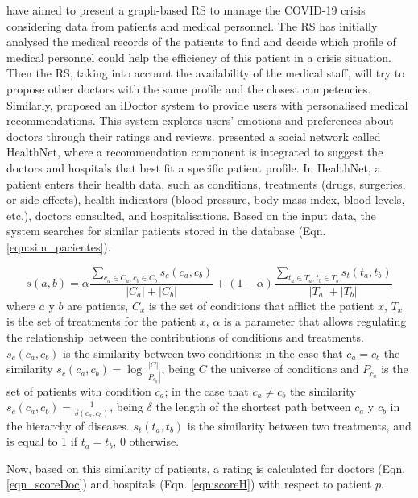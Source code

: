 \documentclass[sustainability,article,submit,pdftex,moreauthors]{Definitions/mdpi}
\begin{document}
\citet{sayeb2022graph} have aimed to present a graph-based RS to manage the COVID-19 crisis considering data from patients and medical personnel. The RS has initially analysed the medical records of the patients to find and decide which profile of medical personnel could help the efficiency of this patient in a crisis situation. Then the RS, taking into account the availability of the medical staff, will try to propose other doctors with the same profile and the closest competencies. Similarly, \citet{zhang2017idoctor} proposed an iDoctor system to provide users with personalised medical recommendations. This system explores users' emotions and preferences about doctors through their ratings and reviews. \citet{narducci2015recommender} presented a social network called HealthNet, where a recommendation component is integrated to suggest the doctors and hospitals that best fit a specific patient profile. In HealthNet, a patient enters their health data, such as conditions, treatments (drugs, surgeries, or side effects), health indicators (blood pressure, body mass index, blood levels, etc.), doctors consulted, and hospitalisations. Based on the input data, the system searches for similar patients stored in the database (Eqn. \ref{eqn:sim_pacientes}).

\begin{equation}
	\label{eqn:sim_pacientes}
	s(a,b)  = \alpha \frac{\sum_{c_a\in C_a,c_b\in C_b} s_c(c_a, c_b)}{|C_a|+|C_b|} + (1-\alpha)\frac{\sum_{t_a\in T_a,t_b\in T_b} s_t(t_a, t_b)}{|T_a|+|T_b|}
\end{equation}
where $a$ y $b$ are patients, $C_x$ is the set of conditions that afflict the patient $x$, $T_x$ is the set of treatments for the patient $x$, $\alpha$ is a parameter that allows regulating the relationship between the contributions of conditions and treatments. $s_c(c_a, c_b)$ is the similarity between two conditions: in the case that $c_a = c_b$ the similarity $s_c(c_a, c_b) = \log \frac{|C|}{|P_{c_a}|}$, being $C$ the universe of conditions and $P_{c_a}$ is the set of patients with condition $c_a$; in the case that $c_a \neq c_b$ the similarity $s_c(c_a, c_b) = \frac{1}{\delta (c_a,c_b)}$, being $\delta$ the length of the shortest path between $c_a$ y $c_b$ in the hierarchy of diseases. $s_t(t_a, t_b)$ is the similarity between two treatments, and is equal to 1 if $t_a = t_b$, 0 otherwise.

Now, based on this similarity of patients, a rating is calculated for doctors (Eqn. \ref{eqn_scoreDoc}) and hospitals (Eqn. \ref{eqn:scoreH}) with respect to patient $p$.
\end{document}
